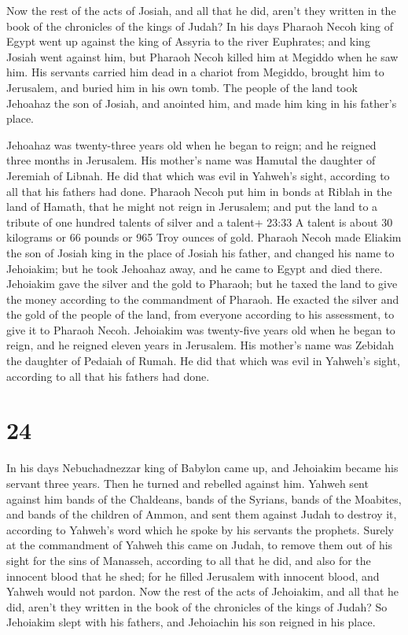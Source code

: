  Now the rest of the acts of Josiah, and all that he did,
aren't they written in the book of the chronicles of the kings of Judah?
 In his days Pharaoh Necoh king of Egypt went up against
the king of Assyria to the river Euphrates; and king Josiah went against
him, but Pharaoh Necoh killed him at Megiddo when he saw him.
 His servants carried him dead in a chariot from Megiddo,
brought him to Jerusalem, and buried him in his own tomb. The people of
the land took Jehoahaz the son of Josiah, and anointed him, and made him
king in his father's place.

 Jehoahaz was twenty-three years old when he began to
reign; and he reigned three months in Jerusalem. His mother's name was
Hamutal the daughter of Jeremiah of Libnah.  He did that
which was evil in Yahweh's sight, according to all that his fathers had
done.  Pharaoh Necoh put him in bonds at Riblah in the land
of Hamath, that he might not reign in Jerusalem; and put the land to a
tribute of one hundred talents of silver and a talent+ 23:33 A talent is
about 30 kilograms or 66 pounds or 965 Troy ounces of gold.
 Pharaoh Necoh made Eliakim the son of Josiah king in the
place of Josiah his father, and changed his name to Jehoiakim; but he
took Jehoahaz away, and he came to Egypt and died there. 
Jehoiakim gave the silver and the gold to Pharaoh; but he taxed the land
to give the money according to the commandment of Pharaoh. He exacted
the silver and the gold of the people of the land, from everyone
according to his assessment, to give it to Pharaoh Necoh. 
Jehoiakim was twenty-five years old when he began to reign, and he
reigned eleven years in Jerusalem. His mother's name was Zebidah the
daughter of Pedaiah of Rumah.  He did that which was evil
in Yahweh's sight, according to all that his fathers had done.

\hypertarget{section-23}{%
\section{24}\label{section-23}}

 In his days Nebuchadnezzar king of Babylon came up, and
Jehoiakim became his servant three years. Then he turned and rebelled
against him.  Yahweh sent against him bands of the
Chaldeans, bands of the Syrians, bands of the Moabites, and bands of the
children of Ammon, and sent them against Judah to destroy it, according
to Yahweh's word which he spoke by his servants the prophets.
 Surely at the commandment of Yahweh this came on Judah, to
remove them out of his sight for the sins of Manasseh, according to all
that he did,  and also for the innocent blood that he shed;
for he filled Jerusalem with innocent blood, and Yahweh would not
pardon.  Now the rest of the acts of Jehoiakim, and all that
he did, aren't they written in the book of the chronicles of the kings
of Judah?  So Jehoiakim slept with his fathers, and
Jehoiachin his son reigned in his place.


